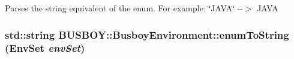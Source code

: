 Parses the string equivalent of the enum. For example: \char`\"{}JAVA\char`\"{} -\/-\/$>$ JAVA \hypertarget{classBUSBOY_1_1BusboyEnvironment_a4566e20c382a55bb6d733c1a72282461}{
\subsubsection[{enumToString}]{\setlength{\rightskip}{0pt plus 5cm}std::string BUSBOY::BusboyEnvironment::enumToString ({\bf EnvSet} {\em envSet})}}
\label{classBUSBOY_1_1BusboyEnvironment_a4566e20c382a55bb6d733c1a72282461}



